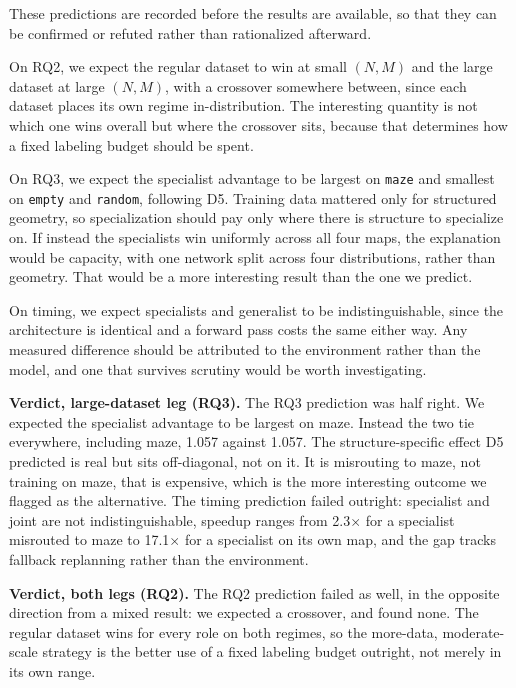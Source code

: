 \documentclass[11pt,a4paper]{article}
\begin{document}
These predictions are recorded before the results are available, so that they can be confirmed or
refuted rather than rationalized afterward.

On RQ2, we expect the regular dataset to win at small $(N,M)$ and the large dataset at large $(N,M)$, with a crossover
somewhere between, since each dataset places its own regime in-distribution. The interesting
quantity is not which one wins overall but where the crossover sits, because that determines how a
fixed labeling budget should be spent.

On RQ3, we expect the specialist advantage to be largest on \texttt{maze} and smallest on
\texttt{empty} and \texttt{random}, following D5. Training data mattered only for structured
geometry, so specialization should pay only where there is structure to specialize on. If instead
the specialists win uniformly across all four maps, the explanation would be capacity, with one
network split across four distributions, rather than geometry. That would be a more interesting
result than the one we predict.

On timing, we expect specialists and generalist to be indistinguishable, since the architecture is
identical and a forward pass costs the same either way. Any measured difference should be attributed
to the environment rather than the model, and one that survives scrutiny would be worth
investigating.

\textbf{Verdict, large-dataset leg (RQ3).} The RQ3 prediction was half right. We expected the
specialist advantage to be largest on maze. Instead the two tie everywhere, including maze, 1.057
against 1.057. The structure-specific effect D5 predicted is real but sits off-diagonal, not on
it. It is misrouting to maze, not training on maze, that is expensive, which is the more
interesting outcome we flagged as the alternative. The timing prediction failed outright:
specialist and joint are not indistinguishable, speedup ranges from 2.3$\times$ for a specialist
misrouted to maze to 17.1$\times$ for a specialist on its own map, and the gap tracks fallback
replanning rather than the environment.

\textbf{Verdict, both legs (RQ2).} The RQ2 prediction failed as well, in the opposite direction
from a mixed result: we expected a crossover, and found none. The regular dataset wins for every role on
both regimes, so the more-data, moderate-scale strategy is the better use of a fixed labeling
budget outright, not merely in its own range.

\end{document}
